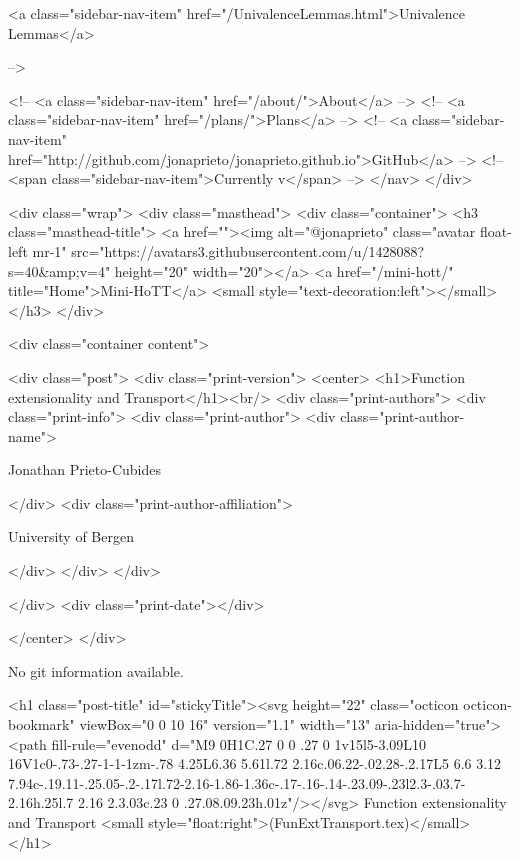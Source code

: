       
    
      
        
          <a class="sidebar-nav-item" href="/UnivalenceLemmas.html">Univalence Lemmas</a>
        
      
     -->

    <!-- <a class="sidebar-nav-item" href="/about/">About</a> -->
    <!-- <a class="sidebar-nav-item" href="/plans/">Plans</a> -->
    <!-- <a class="sidebar-nav-item" href="http://github.com/jonaprieto/jonaprieto.github.io">GitHub</a> -->
    <!-- <span class="sidebar-nav-item">Currently v</span> -->
  </nav>
</div>

    <div class="wrap">
      <div class="masthead">
        <div class="container">
          <h3 class="masthead-title">
            <a href=""><img alt="@jonaprieto" class="avatar float-left mr-1" src="https://avatars3.githubusercontent.com/u/1428088?s=40&amp;v=4" height="20" width="20"></a>
            <a href="/mini-hott/" title="Home">Mini-HoTT</a>
            <small style="text-decoration:left"></small>
          </h3>
        </div>
      
      <div class="container content">
        







<div class="post">
  <div class="print-version">
    <center>
      <h1>Function extensionality and Transport</h1><br/>
        <div class="print-authors">
          <div class="print-info">
            <div class="print-author">
              <div class="print-author-name">
                
                  Jonathan Prieto-Cubides
                
              </div>
              <div class="print-author-affiliation">
                
                  University of Bergen
                
                </div>
            </div>
          </div>
          
          
        </div>
        <div class="print-date"></div>
        
        
    </center>
  </div>

  
  No git information available.
  

  <h1 class="post-title" id="stickyTitle"><svg height="22" class="octicon octicon-bookmark" viewBox="0 0 10 16" version="1.1" width="13" aria-hidden="true"><path fill-rule="evenodd" d="M9 0H1C.27 0 0 .27 0 1v15l5-3.09L10 16V1c0-.73-.27-1-1-1zm-.78 4.25L6.36 5.61l.72 2.16c.06.22-.02.28-.2.17L5 6.6 3.12 7.94c-.19.11-.25.05-.2-.17l.72-2.16-1.86-1.36c-.17-.16-.14-.23.09-.23l2.3-.03.7-2.16h.25l.7 2.16 2.3.03c.23 0 .27.08.09.23h.01z"/></svg> Function extensionality and Transport <small style="float:right">(FunExtTransport.tex)</small>
  </h1>


